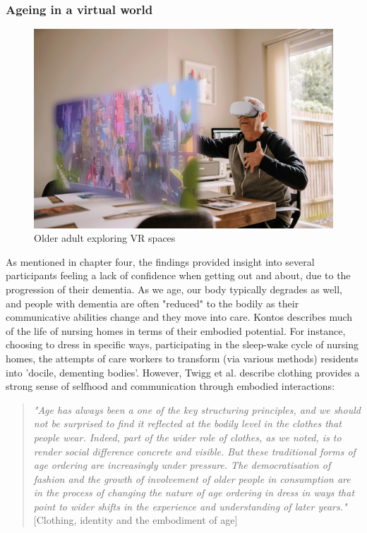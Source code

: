 \subsubsection{Ageing in a virtual world}
\label{FutureStudyOne}
\begin{figure}[htp]
\centering
\includegraphics[width=1\linewidth]{Images/Discussion/Aging_in_VR.png}
\caption{Older adult exploring VR spaces}
\label{fig:Aging_VR}
\end{figure}
As mentioned in chapter four, the findings provided insight into several participants feeling a lack of confidence when getting out and about, due to the progression of their dementia. As we age, our body typically degrades as well, and people with dementia are often "reduced" to the bodily as their communicative abilities change and they move into care. Kontos describes much of the life of nursing homes in terms of their embodied potential. For instance, choosing to dress in specific ways, participating in the sleep-wake cycle of nursing homes, the attempts of care workers to transform (via various methods) residents into 'docile, dementing bodies'. However, Twigg et al. describe clothing provides a strong sense of selfhood and communication through embodied interactions: 
\begin{quote}
\textit{"Age has always been a one of the key structuring principles, and we should not be surprised to find it reflected at the bodily level in the clothes that people wear. Indeed, part of the wider role of clothes, as we noted, is to render social difference concrete and visible. But these traditional forms of age ordering are increasingly under pressure. The democratisation of fashion and the growth of involvement of older people in consumption are in the process of changing the nature of age ordering in dress in ways that point to wider shifts in the experience and understanding of later years." }[Clothing, identity and the embodiment of age]
\end{quote}

